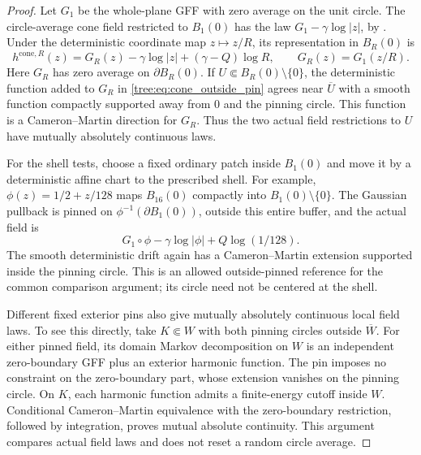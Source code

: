 \begin{proof}
Let $G_1$ be the whole-plane GFF with zero average on the unit circle.
The circle-average cone field restricted to $B_1(0)$ has the law
$G_1-\gamma\log|z|$, by \cite[Definition~4.10 and the following
discussion]{DMS}. Under the deterministic coordinate map $z\mapsto z/R$,
its representation in $B_R(0)$ is
\begin{equation}\label{tree:eq:cone_outside_pin}
 h^{\mathrm{cone},R}(z)
   =G_R(z)-\gamma\log|z|+(\gamma-Q)\log R,
 \qquad G_R(z)=G_1(z/R).
\end{equation}
Here $G_R$ has zero average on $\partial B_R(0)$. If
$U\Subset B_R(0)\setminus\{0\}$, the deterministic function added
to $G_R$ in \eqref{tree:eq:cone_outside_pin} agrees near $\overline U$
with a smooth function compactly supported away from $0$ and the
pinning circle. This function is a Cameron--Martin direction for
$G_R$. Thus the two actual field restrictions to $U$ have mutually
absolutely continuous laws.

For the shell tests, choose a fixed ordinary patch inside $B_1(0)$
and move it by a deterministic affine chart to the prescribed shell.
For example, $\phi(z)=1/2+z/128$ maps $B_{16}(0)$ compactly into
$B_1(0)\setminus\{0\}$. The Gaussian pullback is pinned on
$\phi^{-1}(\partial B_1(0))$, outside this entire buffer, and the
actual field is
\[
 G_1\circ\phi-\gamma\log|\phi|+Q\log(1/128).
\]
The smooth deterministic drift again has a Cameron--Martin extension
supported inside the pinning circle. This is an allowed outside-pinned
reference for the common comparison argument; its circle need not be
centered at the shell.

Different fixed exterior pins also give mutually absolutely continuous
local field laws. To see this directly, take $K\Subset W$ with both
pinning circles outside $\overline W$. For either pinned field, its
domain Markov decomposition on $W$ is an independent zero-boundary
GFF plus an exterior harmonic function. The pin imposes no constraint
on the zero-boundary part, whose extension vanishes on the pinning
circle. On $K$, each harmonic function admits a finite-energy cutoff
inside $W$. Conditional Cameron--Martin equivalence with the
zero-boundary restriction, followed by integration, proves mutual
absolute continuity. This argument compares actual field laws and
does not reset a random circle average.


\end{proof}
